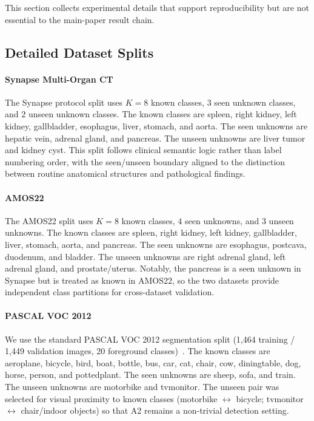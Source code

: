 \documentclass[11pt]{article}
\begin{document}
This section collects experimental details that support reproducibility but are not
essential to the main-paper result chain.

\subsection{Detailed Dataset Splits}

\paragraph{Synapse Multi-Organ CT}
The Synapse protocol split uses $K{=}8$ known classes, $3$ seen unknown classes, and
$2$ unseen unknown classes.
The known classes are spleen, right kidney, left kidney, gallbladder, esophagus,
liver, stomach, and aorta.
The seen unknowns are hepatic vein, adrenal gland, and pancreas.
The unseen unknowns are liver tumor and kidney cyst.
This split follows clinical semantic logic rather than label numbering order, with the
seen/unseen boundary aligned to the distinction between routine anatomical structures
and pathological findings.

\paragraph{AMOS22}
The AMOS22 split uses $K{=}8$ known classes, $4$ seen unknowns, and $3$ unseen
unknowns.
The known classes are spleen, right kidney, left kidney, gallbladder, liver, stomach,
aorta, and pancreas.
The seen unknowns are esophagus, postcava, duodenum, and bladder.
The unseen unknowns are right adrenal gland, left adrenal gland, and prostate/uterus.
Notably, the pancreas is a seen unknown in Synapse but is treated as known in AMOS22,
so the two datasets provide independent class partitions for cross-dataset validation.

\paragraph{PASCAL VOC 2012}
We use the standard PASCAL VOC 2012 segmentation split (1,464 training / 1,449
validation images, 20 foreground classes)~\cite{everingham2010pascal}.
The known classes are aeroplane, bicycle, bird, boat, bottle, bus, car, cat, chair,
cow, diningtable, dog, horse, person, and pottedplant.
The seen unknowns are sheep, sofa, and train.
The unseen unknowns are motorbike and tvmonitor.
The unseen pair was selected for visual proximity to known classes
(motorbike $\leftrightarrow$ bicycle; tvmonitor $\leftrightarrow$ chair/indoor objects)
so that A2 remains a non-trivial detection setting.
\end{document}
